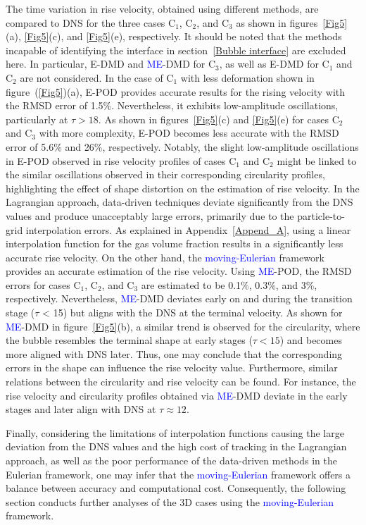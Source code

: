 \documentclass[a4paper,fleqn]{cas-sc}
\newcommand{\hl}[1]{\textcolor{blue}{#1}} %
\newcommand{\hl}[1]{#1} %
\begin{document}
	The time variation in rise velocity, obtained using different methods, are compared to DNS for the three cases C$_1$, C$_2$, and C$_3$ as shown in figures~\ref{Fig5}(a), \ref{Fig5}(c), and \ref{Fig5}(e), respectively. It should be noted that the methods incapable of identifying the interface in section~\ref{Bubble interface} are excluded here. In particular, E-DMD and \hl{ME}-DMD for C$_3$, as well as E-DMD for C$_1$ and C$_2$ are not considered. In the case of C$_1$ with less deformation shown in figure~(\ref{Fig5})(a), E-POD provides accurate results for the rising velocity with the RMSD error of 1.5\%. Nevertheless, it exhibits low-amplitude oscillations, particularly at $\tau >18$. As shown in figures~\ref{Fig5}(c) and \ref{Fig5}(e) for cases C$_2$ and C$_3$ with more complexity, E-POD becomes less accurate with the RMSD error of 5.6\% and 26\%, respectively. Notably, the slight low-amplitude oscillations in E-POD observed in rise velocity profiles of cases C$_1$ and C$_2$ might be linked to the similar oscillations observed in their corresponding circularity profiles, highlighting the effect of shape distortion on the estimation of rise velocity. In the Lagrangian approach, data-driven techniques deviate significantly from the DNS values and produce unacceptably large errors, primarily due to the particle-to-grid interpolation errors. As explained in Appendix~\ref{Append_A}, using a linear interpolation function for the gas volume fraction results in a significantly less accurate rise velocity. On the other hand, the \hl{moving-Eulerian} framework provides an accurate estimation of the rise velocity. Using \hl{ME}-POD, the RMSD errors for cases C$_1$, C$_2$, and C$_3$ are estimated to be 0.1\%, 0.3\%, and 3\%, respectively. Nevertheless, \hl{ME}-DMD deviates early on and during the transition stage ($\tau$ < 15) but aligns with the DNS at the terminal velocity. As shown for \hl{ME}-DMD in figure~\ref{Fig5}(b), a similar trend is observed for the circularity, where the bubble resembles the terminal shape at early stages ($\tau < 15$) and becomes more aligned with DNS later. Thus, one may conclude that the corresponding errors in the shape can influence the rise velocity value. Furthermore, similar relations between the circularity and rise velocity can be found. For instance, the rise velocity and circularity profiles obtained via \hl{ME}-DMD deviate in the early stages and later align with DNS at $\tau \approx 12$. 
	
	Finally, considering the limitations of interpolation functions causing the large deviation from the DNS values and the high cost of tracking in the Lagrangian approach, as well as the poor performance of the data-driven methods in the Eulerian framework, one may infer that the \hl{moving-Eulerian} framework offers a balance between accuracy and computational cost. Consequently, the following section conducts further analyses of the 3D cases using the \hl{moving-Eulerian} framework.
	
\end{document}
